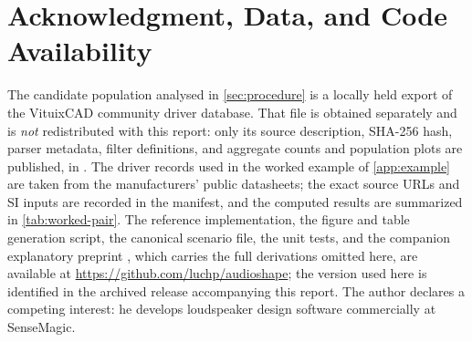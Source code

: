 \documentclass[fleqn]{jaes}
\numberwithin{equation}{section}
\begin{document}
\section*{Acknowledgment, Data, and Code Availability}
The candidate population analysed in \cref{sec:procedure} is a locally held
export of the VituixCAD community driver database. That file is obtained
separately and is \emph{not} redistributed with this report: only its
source description, SHA-256 hash, parser metadata, filter definitions, and
aggregate counts and population plots are published, in
. The driver
records used in the worked example of \cref{app:example} are taken from the
manufacturers' public datasheets; the exact source URLs and SI inputs are
recorded in the manifest, and the computed results are summarized in
\cref{tab:worked-pair}. The reference implementation, the figure and table
generation script, the canonical scenario file, the unit tests, and the
companion explanatory preprint \cite{audioshape-preprint}, which carries the
full derivations omitted here, are available at
\url{https://github.com/luchp/audioshape}; the version used here is
identified in the archived release accompanying this report.
The author declares a competing interest: he develops loudspeaker
design software commercially at SenseMagic.

\appendix






\makeatletter
\authorgdtrue
\makeatother
\end{document}
